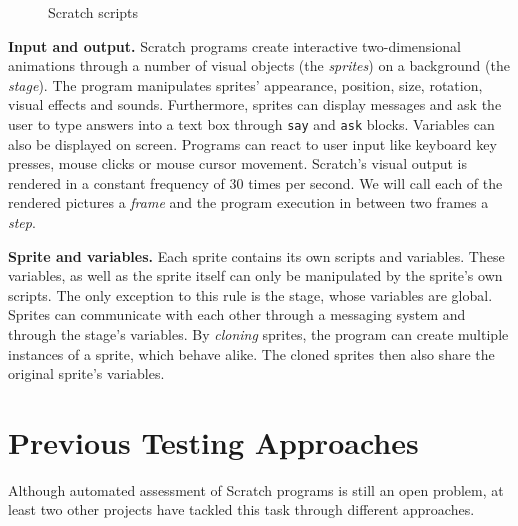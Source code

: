 \begin{figure}[htpb]
    \centering
    \caption{Scratch scripts}
    \label{fig:scratch_code}
\end{figure}

\textbf{Input and output.}
Scratch programs create interactive two-dimensional animations through a number of visual objects (the \textit{sprites}) on a background (the \textit{stage}).
The program manipulates sprites' appearance, position, size, rotation, visual effects and sounds.
Furthermore, sprites can display messages and ask the user to type answers into a text box through \texttt{say} and \texttt{ask} blocks.
Variables can also be displayed on screen.
Programs can react to user input like keyboard key presses, mouse clicks or mouse cursor movement.
Scratch's visual output is rendered in a constant frequency of 30 times per second.
We will call each of the rendered pictures a \textit{frame} and the program execution in between two frames a \textit{step}.
\parspace

\textbf{Sprite and variables.}
Each sprite contains its own scripts and variables.
These variables, as well as the sprite itself can only be manipulated by the sprite's own scripts.
The only exception to this rule is the stage, whose variables are global.
Sprites can communicate with each other through a messaging system and through the stage's variables.
By \textit{cloning} sprites, the program can create multiple instances of a sprite, which behave alike.
The cloned sprites then also share the original sprite's variables.

\section{Previous Testing Approaches}%
\label{sec:previous_testing_approaches}

Although automated assessment of Scratch programs is still an open problem,
at least two other projects have tackled this task through different approaches.
\parspace

